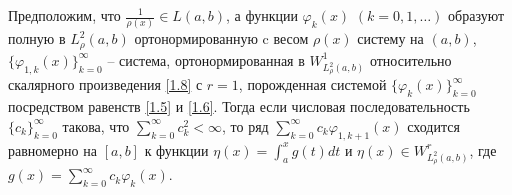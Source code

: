 \begin{corollary}
Предположим, что  $ \frac{1}{\rho(x)}\in L(a,b) $, а  функции $\varphi_k(x)$ $(k=0,1,\ldots)$  образуют полную в $L^2_\rho(a,b)$ ортонормированную   c весом   $\rho(x)$ систему на $(a,b)$, $\{\varphi_{1,k}(x)\}_{k=0}^\infty$ -- система, ортонормированная в $W^1_{L^2_\rho(a,b)}$ относительно скалярного произведения \eqref{1.8} с $r=1$,  порожденная системой $\{\varphi_{k}(x)\}_{k=0}^\infty$ посредством равенств \eqref{1.5} и \eqref{1.6}.
Тогда если числовая последовательность $\{c_k\}_{k=0}^\infty$ такова, что $\sum_{k=0}^\infty c_k^2<\infty$, то  ряд  $\sum_{k=0}^\infty c_k\varphi_{1,k+1}(x)$ сходится равномерно на $[a,b]$ к функции $\eta(x)=\int_a^x g(t)dt$ и  $\eta(x)\in W^r_{L^2_\rho(a,b)}$, где $g(x)=\sum_{k=0}^\infty c_k\varphi_{k}(x)$.
\end{corollary}
%
%
%
%
%
%



\vskip 0.2cm



